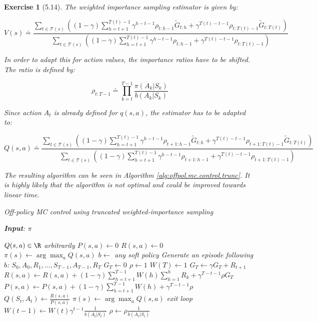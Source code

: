 \documentclass[a4paper]{scrartcl}
\theoremstyle{nonumberplain}
\newtheorem{ex}{Exercise}
\begin{document}
\begin{ex}[5.14]
The weighted importance sampling estimator is given by:

\begin{equation}
V(s) \doteq \frac{\sum_{t\in \mathcal{T}(s)}\left((1-\gamma) \sum_{h=t+1}^{T(t)-1}\gamma^{h-t-1}\rho_{t:h-1} \tilde{G}_{t:h} + \gamma^{T(t)-t-1}\rho_{t:T(t)-1} \tilde{G}_{t:T(t)}\right)}
{\sum_{t\in \mathcal{T}(s)}\left((1-\gamma) \sum_{h=t+1}^{T(t)-1}\gamma^{h-t-1}\rho_{t:h-1} + \gamma^{T(t)-t-1}\rho_{t:T(t)-1}\right)}
\end{equation}

In order to adapt this for action values, the importance ratios have to be shifted. The ratio is defined by:

\begin{equation}
\rho_{t:T-1}\doteq \prod_{k=t}^{T-1} \frac{ \pi(A_k|S_k)}{b(A_k|S_k)}
\end{equation}

Since action $A_t$ is already defined for $q(s,a)$, the estimator has to be adapted to:

\begin{equation}
Q(s,a) \doteq \frac{\sum_{t\in \mathcal{T}(s)}\left((1-\gamma) \sum_{h=t+1}^{T(t)-1}\gamma^{h-t-1}\rho_{t+1:h-1} \tilde{G}_{t:h} + \gamma^{T(t)-t-1}\rho_{t+1:T(t)-1} \tilde{G}_{t:T(t)}\right)}
{\sum_{t\in \mathcal{T}(s)}\left((1-\gamma) \sum_{h=t+1}^{T(t)-1}\gamma^{h-t-1}\rho_{t+1:h-1} + \gamma^{T(t)-t-1}\rho_{t+1:T(t)-1}\right)}
\end{equation}

The resulting algorithm can be seen in Algorithm \autoref{alg:offpol.mc.control.trunc}. It is highly likely that the algorithm is not optimal and could be improved towards linear time.

\begin{algorithm}
	\caption{Off-policy MC control using truncated weighted-importance sampling}
	\label{alg:offpol.mc.control.trunc}
	\textbf{Input}: $\pi$
	
	\begin{algorithmic}
		\State $Q(s,a)\in\R$ arbitrarily
		\State $P(s,a) \gets 0$
		\State $R(s,a) \gets 0$
		\State $\pi(s) \gets \arg\max_a Q(s,a)$
		\EndFor
		\State $b \gets$ any soft policy
		\State Generate an episode following $b$: $S_0,A_0,R_1,\dots, S_{T-1},A_{T-1},R_T$
		\State $G_T \gets 0$
		\State $\rho \gets 1$
		\State $W(T) \gets 1$
		\State $G_T \gets \gamma G_T + R_{t+1}$
		\State $R(s,a) \gets R(s,a) + (1-\gamma) \sum_{h=t+1}^{T-1} W(h) \sum_{k=1}^{h} R_k + \gamma^{T-t-1} \rho G_T$
		\State $P(s,a) \gets P(s,a) + (1-\gamma) \sum_{h=t+1}^{T-1} W(h) + \gamma^{T-t-1} \rho$
		\State $Q(S_t,A_t) \gets \frac{R(s,a)}{P(s,a)}$
		\State $\pi(s) \gets \arg\max_a Q(s,a)$
		exit loop
		\EndIf
		\State $W(t - 1) \gets W(t) \gamma^{t - 1}\frac{1}{b(A_t|S_t)}$
		\State $\rho \gets \rho \frac{1}{b(A_t|S_t)}$
		\EndFor
		\EndWhile
	\end{algorithmic}
\end{algorithm}

\end{ex}
\end{document}
